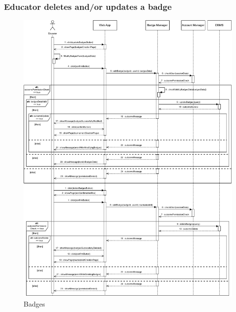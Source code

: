 \documentclass{article}
\begin{document}
{    \subsubsection{Educator deletes and/or updates a badge}
        \begin{figure}[H]
            \centering
            \hspace*{-0.7cm}\includegraphics[scale=0.60]{Sequence/Sequence5DD.pdf}
            \caption{Badges }
            \label{fig:Sequence5DD}
        \end{figure}
        
}
\end{document}
